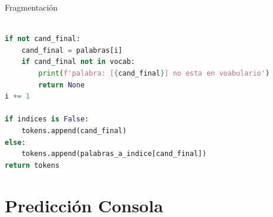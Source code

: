 \documentclass{beamer}
\begin{document}
\begin{frame}[fragile]{Fragmentación}
	\begin{lstlisting}[language=Python]

if not cand_final:
	cand_final = palabras[i]
	if cand_final not in vocab:
		print(f'palabra: [{cand_final}] no esta en voabulario') 
		return None
i += 1

if indices is False:
	tokens.append(cand_final)
else:
	tokens.append(palabras_a_indice[cand_final])
return tokens
	\end{lstlisting}
\end{frame}


\section{Predicción Consola}
\end{document}
